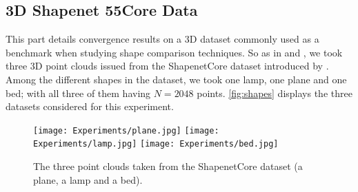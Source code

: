 \subsection{3D Shapenet 55Core Data}

{This part details convergence results on a 3D dataset commonly used 
{as a benchmark when studying}
shape comparison {techniques}.} {So} as in 
\citep{nguyen2024quasimonte} and 
\citep{leluc2024slicedwassersteinestimationsphericalharmonics}, we took three 3D 
point clouds issued from the ShapenetCore dataset introduced by 
\citep{chang2015shapenetinformationrich3dmodel}. Among the different shapes in 
the dataset, we took one lamp, one plane and one bed; with all three of them 
having $N=2048$ points. \autoref{fig:shapes} {displays} the three 
data{sets} 
{considered} for this experiment.

\begin{figure}[h!]
\centering
\texttt{[image: Experiments/plane.jpg]}
\texttt{[image: Experiments/lamp.jpg]}
\texttt{[image: Experiments/bed.jpg]}
\caption{The three 
{point clouds}
taken from the ShapenetCore 
{dataset}
{(}a plane, a lamp and a bed{)}.}
\label{fig:shapes}
\end{figure}




